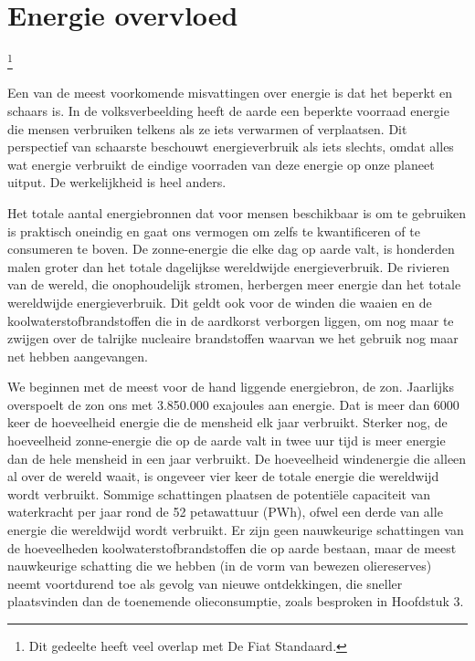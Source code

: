 \documentclass[
  a5paper,
  smalldemyvopaper,11pt,twoside,onecolumn,openright,extrafontsizes,
hidelinks]{memoir}
\begin{document}
\section{Energie overvloed}\label{energie-overvloed}

\footnote{Dit gedeelte heeft veel overlap met De Fiat Standaard.}

Een van de meest voorkomende misvattingen over energie is dat het
beperkt en schaars is. In de volksverbeelding heeft de aarde een
beperkte voorraad energie die mensen verbruiken telkens als ze iets
verwarmen of verplaatsen. Dit perspectief van schaarste beschouwt
energieverbruik als iets slechts, omdat alles wat energie verbruikt de
eindige voorraden van deze energie op onze planeet uitput. De
werkelijkheid is heel anders.

Het totale aantal energiebronnen dat voor mensen beschikbaar is om te
gebruiken is praktisch oneindig en gaat ons vermogen om zelfs te
kwantificeren of te consumeren te boven. De zonne-energie die elke dag
op aarde valt, is honderden malen groter dan het totale dagelijkse
wereldwijde energieverbruik. De rivieren van de wereld, die
onophoudelijk stromen, herbergen meer energie dan het totale wereldwijde
energieverbruik. Dit geldt ook voor de winden die waaien en de
koolwaterstofbrandstoffen die in de aardkorst verborgen liggen, om nog
maar te zwijgen over de talrijke nucleaire brandstoffen waarvan we het
gebruik nog maar net hebben aangevangen.

We beginnen met de meest voor de hand liggende energiebron, de zon.
Jaarlijks overspoelt de zon ons met 3.850.000 exajoules aan energie. Dat
is meer dan 6000 keer de hoeveelheid energie die de mensheid elk jaar
verbruikt. Sterker nog, de hoeveelheid zonne-energie die op de aarde
valt in twee uur tijd is meer energie dan de hele mensheid in een jaar
verbruikt. De hoeveelheid windenergie die alleen al over de wereld
waait, is ongeveer vier keer de totale energie die wereldwijd wordt
verbruikt. Sommige schattingen plaatsen de potentiële capaciteit van
waterkracht per jaar rond de 52 petawattuur (PWh), ofwel een derde van
alle energie die wereldwijd wordt verbruikt. Er zijn geen nauwkeurige
schattingen van de hoeveelheden koolwaterstofbrandstoffen die op aarde
bestaan, maar de meest nauwkeurige schatting die we hebben (in de vorm
van bewezen oliereserves) neemt voortdurend toe als gevolg van nieuwe
ontdekkingen, die sneller plaatsvinden dan de toenemende olieconsumptie,
zoals besproken in Hoofdstuk 3.
\end{document}
